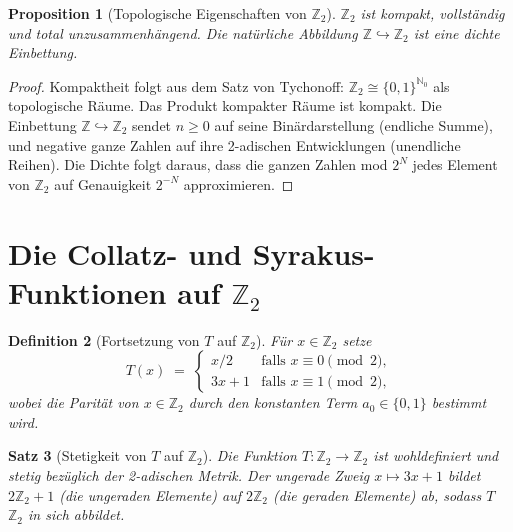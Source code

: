 \documentclass[12pt,a4paper]{article}
\newtheorem{theorem}{Satz}[section]
\newtheorem{proposition}[theorem]{Proposition}
\newtheorem{definition}[theorem]{Definition}
\begin{document}
\begin{proposition}[Topologische Eigenschaften von $\mathbb{Z}_2$]\label{prop:topologie}
$\mathbb{Z}_2$ ist kompakt, vollständig und total unzusammenhängend. Die natürliche
Abbildung $\mathbb{Z} \hookrightarrow \mathbb{Z}_2$ ist eine dichte Einbettung.
\end{proposition}

\begin{proof}
Kompaktheit folgt aus dem Satz von Tychonoff: $\mathbb{Z}_2 \cong \{0,1\}^{\mathbb{N}_0}$
als topologische Räume. Das Produkt kompakter Räume ist kompakt. Die Einbettung
$\mathbb{Z} \hookrightarrow \mathbb{Z}_2$ sendet $n \geq 0$ auf seine Binärdarstellung
(endliche Summe), und negative ganze Zahlen auf ihre 2-adischen Entwicklungen (unendliche
Reihen). Die Dichte folgt daraus, dass die ganzen Zahlen mod $2^N$ jedes Element von
$\mathbb{Z}_2$ auf Genauigkeit $2^{-N}$ approximieren.
\end{proof}

\section{Die Collatz- und Syrakus-Funktionen auf $\mathbb{Z}_2$}\label{sec:collatz_2adisch}

\begin{definition}[Fortsetzung von $T$ auf $\mathbb{Z}_2$]\label{def:T_fort}
Für $x \in \mathbb{Z}_2$ setze
\[
  T(x) \;=\; \begin{cases} x/2 & \text{falls } x \equiv 0 \pmod{2}, \\
                            3x+1 & \text{falls } x \equiv 1 \pmod{2},
              \end{cases}
\]
wobei die Parität von $x \in \mathbb{Z}_2$ durch den konstanten Term $a_0 \in \{0,1\}$
bestimmt wird.
\end{definition}

\begin{theorem}[Stetigkeit von $T$ auf $\mathbb{Z}_2$]\label{thm:stetig}
Die Funktion $T\colon \mathbb{Z}_2 \to \mathbb{Z}_2$ ist wohldefiniert und stetig
bezüglich der 2-adischen Metrik. Der ungerade Zweig $x \mapsto 3x+1$ bildet
$2\mathbb{Z}_2 + 1$ (die ungeraden Elemente) auf $2\mathbb{Z}_2$ (die geraden Elemente)
ab, sodass $T$ $\mathbb{Z}_2$ in sich abbildet.
\end{theorem}
\end{document}

